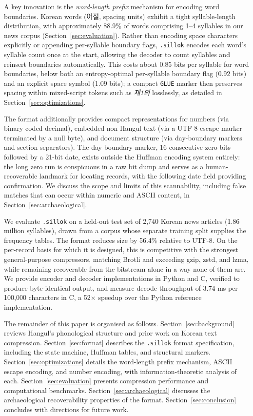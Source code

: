 \documentclass[conference]{IEEEtran}
\begin{document}
A key innovation is the \emph{word-length prefix} mechanism for encoding word boundaries. Korean words (어절, spacing units) exhibit a tight syllable-length distribution, with approximately 88.9\% of words comprising 1--4 syllables in our news corpus (Section~\ref{sec:evaluation}). Rather than encoding space characters explicitly or appending per-syllable boundary flags, \texttt{.sillok} encodes each word's syllable count once at the start, allowing the decoder to count syllables and reinsert boundaries automatically. This costs about 0.85 bits per syllable for word boundaries, below both an entropy-optimal per-syllable boundary flag (0.92 bits) and an explicit space symbol (1.09 bits); a compact \texttt{GLUE} marker then preserves spacing within mixed-script tokens such as \emph{제1의} losslessly, as detailed in Section~\ref{sec:optimizations}.

The format additionally provides compact representations for numbers (via binary-coded decimal), embedded non-Hangul text (via a UTF-8 escape marker terminated by a null byte), and document structure (via day-boundary markers and section separators). The day-boundary marker, 16 consecutive zero bits followed by a 21-bit date, exists outside the Huffman encoding system entirely: the long zero run is conspicuous in a raw bit dump and serves as a human-recoverable landmark for locating records, with the following date field providing confirmation. We discuss the scope and limits of this scannability, including false matches that can occur within numeric and ASCII content, in Section~\ref{sec:archaeological}.

We evaluate \texttt{.sillok} on a held-out test set of 2{,}740 Korean news articles (1.86 million syllables), drawn from a corpus whose separate training split supplies the frequency tables. The format reduces size by 56.4\% relative to UTF-8. On the per-record basis for which it is designed, this is competitive with the strongest general-purpose compressors, matching Brotli and exceeding gzip, zstd, and lzma, while remaining recoverable from the bitstream alone in a way none of them are. We provide encoder and decoder implementations in Python and C, verified to produce byte-identical output, and measure decode throughput of 3.74 ms per 100,000 characters in C, a 52$\times$ speedup over the Python reference implementation.

The remainder of this paper is organised as follows. Section~\ref{sec:background} reviews Hangul's phonological structure and prior work on Korean text compression. Section~\ref{sec:format} describes the \texttt{.sillok} format specification, including the state machine, Huffman tables, and structural markers. Section~\ref{sec:optimizations} details the word-length prefix mechanism, ASCII escape encoding, and number encoding, with information-theoretic analysis of each. Section~\ref{sec:evaluation} presents compression performance and computational benchmarks. Section~\ref{sec:archaeological} discusses the archaeological recoverability properties of the format. Section~\ref{sec:conclusion} concludes with directions for future work.
\end{document}
